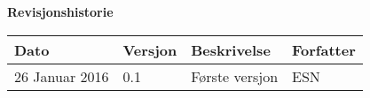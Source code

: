 
\usepackage[small,euler-digits]{eulervm}
\usepackage{color}

\usepackage{a4wide}
\usepackage[top=2cm, margin=2.5cm]{geometry}



\usepackage{graphicx}
\graphicspath{ {img/} }


\newcommand{\tuple}[1]{\ensuremath{\langle #1\rangle}}
\newcommand{\set}[1]{\ensuremath{\{#1\}}}
\newcommand{\imp}{\ensuremath{\rightarrow}}
\newcommand{\M}{\ensuremath{\mathcal{M}}}
\newcommand{\AF}{edge from parent[draw=none]}
\newcommand{\NODE}[1]{\{node \{\ensuremath{#1}\}\}}
\usepackage{textcomp}


\usepackage[]{mcode}




\maketitle

\newpage
\textbf{Revisjonshistorie} \\
\begin{tabular}{|l|l|l|l|}
    \hline
    \textbf{Dato} & \textbf{Versjon} & \textbf{Beskrivelse} & \textbf{Forfatter} \\
    \hline
    26 Januar 2016 & 0.1 & Første versjon & ESN \\
    \hline
\end{tabular}
\newpage
\tableofcontents
\newpage


\newpage

\newpage

\newpage

\newpage





\newpage
\begin{appendices}
\label{appendix:script}
\end{appendices}

